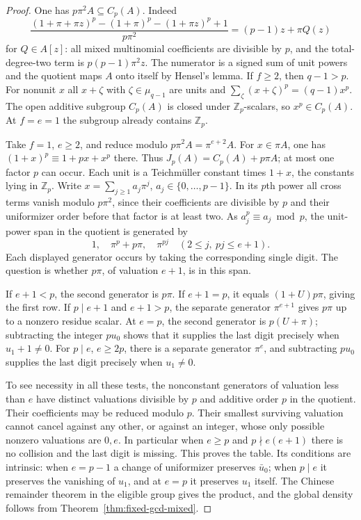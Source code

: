 \documentclass[11pt,letterpaper]{article}
\theoremstyle{definition}
\numberwithin{equation}{section}
\begin{document}
\begin{proof}
One has $p\pi^2 A\subseteq C_p(A)$. Indeed
\[
 \frac{(1+\pi+\pi z)^p-(1+\pi)^p-(1+\pi z)^p+1}{p\pi^2}
                   =(p-1)z+\pi Q(z)
\]
for $Q\in A[z]$: all mixed multinomial coefficients are divisible
by $p$, and the total-degree-two term is $p(p-1)\pi^2z$.
The numerator is a signed sum of unit powers and the quotient maps
$A$ onto itself by Hensel's lemma. If $f\ge2$, then $q-1>p$.
For nonunit $x$ all $x+\zeta$ with $\zeta\in\mu_{q-1}$ are units and
$\sum_{\zeta}(x+\zeta)^p=(q-1)x^p$. The open additive subgroup
$C_p(A)$ is closed under $\mathbb Z_p$-scalars, so $x^p\in C_p(A)$.
At $f=e=1$ the subgroup already contains $\mathbb Z_p$.

Take $f=1$, $e\ge2$, and reduce modulo $p\pi^2A=\pi^{e+2}A$.
For $x\in\pi A$, one has
$(1+x)^p\equiv1+px+x^p$ there. Thus $J_p(A)=C_p(A)+p\pi A$;
at most one factor $p$ can occur. Each unit is a Teichm\"uller
constant times $1+x$, the constants lying in $\mathbb Z_p$.
Write $x=\sum_{j\ge1}a_j\pi^j$, $a_j\in\{0,\ldots,p-1\}$.
In its $p$th power all cross terms vanish modulo $p\pi^2$, since
their coefficients are divisible by $p$ and their uniformizer
order before that factor is at least two. As $a_j^p\equiv a_j\bmod p$,
the unit-power span in the quotient is generated by
\[
  1,\quad \pi^p+p\pi,\quad \pi^{pj}
                         \quad(2\le j,\ pj\le e+1).
\]
Each displayed generator occurs by taking the corresponding single
digit. The question is whether $p\pi$, of valuation $e+1$, is in
this span.

If $e+1<p$, the second generator is $p\pi$.
If $e+1=p$, it equals $(1+U)p\pi$, giving the first row.
If $p\mid e+1$ and $e+1>p$, the separate generator $\pi^{e+1}$
gives $p\pi$ up to a nonzero residue scalar. At $e=p$, the second
generator is $p(U+\pi)$; subtracting the integer $pu_0$ shows
that it supplies the last digit precisely when $u_1+1\ne0$.
For $p\mid e$, $e\ge2p$, there is a separate generator $\pi^e$,
and subtracting $pu_0$ supplies the last digit precisely when
$u_1\ne0$.

To see necessity in all these tests, the nonconstant generators
of valuation less than $e$ have distinct valuations divisible by
$p$ and additive order $p$ in the quotient. Their coefficients may
be reduced modulo $p$. Their smallest surviving valuation cannot
cancel against any other, or against an integer, whose only possible
nonzero valuations are $0,e$. In particular when $e\ge p$ and
$p\nmid e(e+1)$ there is no collision and the last digit is missing.
This proves the table. Its conditions are intrinsic: when $e=p-1$
a change of uniformizer preserves $\bar u_0$; when $p\mid e$ it
preserves the vanishing of $u_1$, and at $e=p$ it preserves $u_1$
itself. The Chinese remainder theorem in the eligible group gives
the product, and the global density follows from
Theorem~\ref{thm:fixed-gcd-mixed}.
\end{proof}
\end{document}
